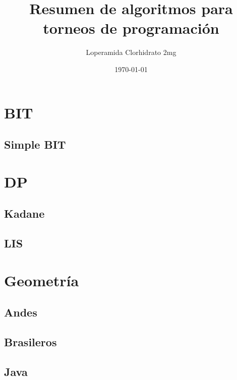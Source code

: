 \documentclass[10pt,letterpaper,twocolumn,twosided]{article}
\newcommand{\codigofuente}[1]{

\dotfill
}
\begin{document}
\title{Resumen de algoritmos para torneos de programación}
\author{Loperamida Clorhidrato 2mg}
\date{\today}
\maketitle

\tableofcontents
{}
\section{BIT}
\subsection{Simple BIT}
\codigofuente{./bit/simple-binary-indexed-tree.cc}
\section{DP}
\subsection{Kadane}
\codigofuente{./dp/kadane.cpp}
\subsection{LIS}
\codigofuente{./dp/lis.cpp}
\section{Geometría}
\subsection{Andes}
\codigofuente{./geometria/geometria.cpp}
\subsection{Brasileros}
\codigofuente{./geometria/geo.cpp}
\subsection{Java}
\codigofuente{./geometria/geojava.java}
\end{document}
